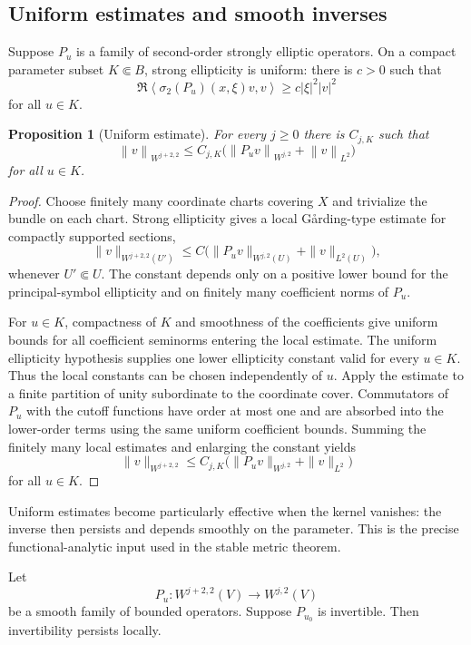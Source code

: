\documentclass[11pt,reqno]{amsart}
\newtheorem{proposition}[theorem]{Proposition}
\theoremstyle{definition}
\theoremstyle{remark}
\newcommand{\ip}[2]{\left\langle #1,#2\right\rangle}
\newcommand{\norm}[1]{\left\lVert #1\right\rVert}
\newcommand{\abs}[1]{\left\lvert #1\right\rvert}
\begin{document}
\subsection{Uniform estimates and smooth inverses}

Suppose $P_u$ is a family of second-order strongly elliptic operators.  On a compact parameter subset $K\Subset B$, strong ellipticity is uniform: there is $c>0$ such that
\[
  \Re\ip{\sigma_2(P_u)(x,\xi)v}{v}
  \ge c\abs\xi^2\abs v^2
\]
for all $u\in K$.

\begin{proposition}[Uniform estimate]\label{prop:uniform-estimate-app}
For every $j\ge0$ there is $C_{j,K}$ such that
\[
  \norm{v}_{W^{j+2,2}}
  \le C_{j,K}
  \bigl(\norm{P_uv}_{W^{j,2}}+\norm v_{L^2}\bigr)
\]
for all $u\in K$.
\end{proposition}

\begin{proof}
Choose finitely many coordinate charts covering $X$ and trivialize the bundle on each chart.  Strong ellipticity gives a local G\aa rding-type estimate for compactly supported sections,
\[
  \|v\|_{W^{j+2,2}(U')}
  \le C\bigl(\|P_uv\|_{W^{j,2}(U)}+\|v\|_{L^2(U)}\bigr),
\]
whenever $U'\Subset U$.  The constant depends only on a positive lower bound for the principal-symbol ellipticity and on finitely many coefficient norms of $P_u$.

For $u\in K$, compactness of $K$ and smoothness of the coefficients give uniform bounds for all coefficient seminorms entering the local estimate.  The uniform ellipticity hypothesis supplies one lower ellipticity constant valid for every $u\in K$.  Thus the local constants can be chosen independently of $u$.  Apply the estimate to a finite partition of unity subordinate to the coordinate cover.  Commutators of $P_u$ with the cutoff functions have order at most one and are absorbed into the lower-order terms using the same uniform coefficient bounds.  Summing the finitely many local estimates and enlarging the constant yields
\[
  \|v\|_{W^{j+2,2}}
  \le C_{j,K}\bigl(\|P_uv\|_{W^{j,2}}+\|v\|_{L^2}\bigr)
\]
for all $u\in K$.
\end{proof}


Uniform estimates become particularly effective when the kernel vanishes: the inverse then persists and depends smoothly on the parameter.  This is the precise functional-analytic input used in the stable metric theorem.


Let
\[
  P_u:W^{j+2,2}(V)\to W^{j,2}(V)
\]
be a smooth family of bounded operators.  Suppose $P_{u_0}$ is invertible.  Then invertibility persists locally.
\end{document}
